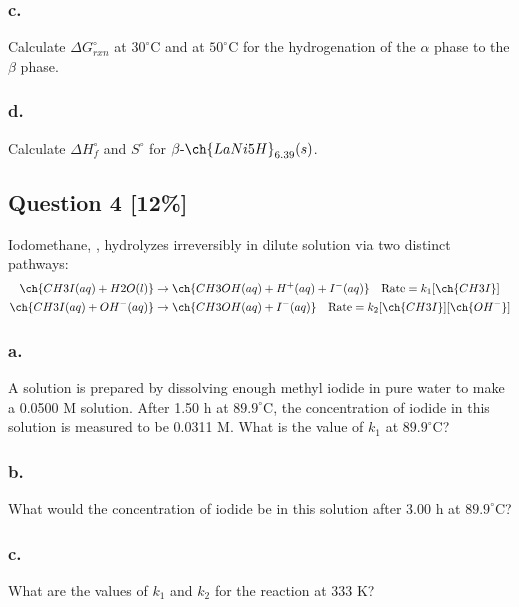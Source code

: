 \documentclass[11pt,letterpaper]{article}
\begin{document}
\subsubsection*{c.}
Calculate $\Delta G^\circ_{rxn}$ at $30^\circ\text{C}$ and at $50^\circ\text{C}$ for the hydrogenation of the $\alpha$ phase to the $\beta$ phase.
\vspace{3cm}

\subsubsection*{d.}
Calculate $\Delta H^\circ_f$ and $S^\circ$ for $\beta\text{-}\ch{LaNi5H}_{6.39}(s)$.
\vspace{3cm}

\newpage
\subsection*{Question 4 [12\%]}
Iodomethane, , hydrolyzes irreversibly in dilute solution via two distinct pathways:
\begin{align*}
    \ch{CH3I(aq) + H2O(l)} &\rightarrow \ch{CH3OH(aq) + H^+(aq) + I^-(aq)} \quad \text{Rate} = k_1[\ch{CH3I}] \\
    \ch{CH3I(aq) + OH^-(aq)} &\rightarrow \ch{CH3OH(aq) + I^-(aq)} \quad \text{Rate} = k_2[\ch{CH3I}][\ch{OH^-}]
\end{align*}

\subsubsection*{a.}
A solution is prepared by dissolving enough methyl iodide in pure water to make a 0.0500 M solution. After 1.50 h at $89.9^{\circ}\text{C}$, the concentration of iodide in this solution is measured to be 0.0311 M. What is the value of $k_1$ at $89.9^{\circ}\text{C}$?
\vspace{4cm}

\subsubsection*{b.}
What would the concentration of iodide be in this solution after 3.00 h at $89.9^{\circ}\text{C}$?
\vspace{4cm}

\subsubsection*{c.}
What are the values of $k_1$ and $k_2$ for the reaction at 333 K?
\vspace{4cm}
\end{document}
